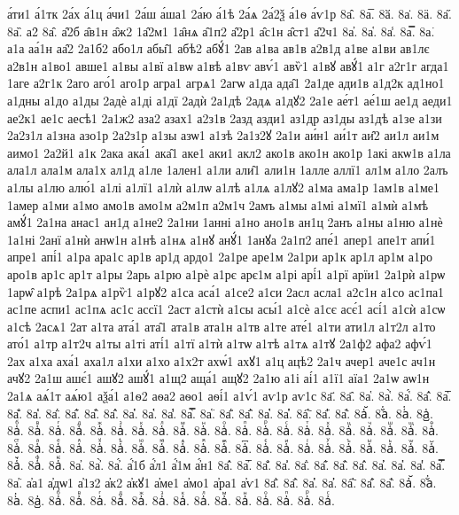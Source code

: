 {а́ти1
а́1тк
2а́х
а́1ц
а́чи1
2а́ш
а́ша1
2а́ю
а́1ѣ
2а́ѧ
2а́2ѯ
а́1ѳ
а́ѵ1р
8а̂.
8а̅.
8ӑ.
8а̇.
8ӓ.
8а̋.
8а̏.
а2̑
8а̑.
а̑2б
а̑в1н
а̑ж2
1а̑2м1
1а̑нѧ
а̑1п2
а̑2р1
а̑с1н
а̑ст1
а̑2ч1
8а̓.
8а̔.
8а̾.
8а̿.
8а͘.
а1а
аа́1н
аа̑2
2а1б2
або1л
абы̑1
абѣ2
абꙋ́1
2ав
а1ва
ав1в
а2в1д
а1ве
а1ви
ав1лє
а2в1н
а1во1
авше1
а1вы
а1вї
а1вѡ
а1вѣ
а1вѵ
авѵ́1
авѷ1
а1вꙋ
авꙋ́1
а1г
а2г1г
агда1
1аге
а2г1к
2аго
аго́1
аго1р
агра1
агрѧ1
2агѡ
а1да
ада̑1
2а1де
ади1в
а1д2к
ад1но1
а1дны
а1до
а1ды
2адѐ
а1ді
а1дї
2адѝ
2а1дѣ
2адѧ
а1дꙋ2
2а1е
ае́т1
ае́1ш
ае1д
аеди1
ае2к1
ае1с
аесѣ1
2а1ж2
аза2
азах1
а2з1в
2азд
азди1
аз1др
аз1ды
аз1дѣ
а1зе
а1зи
2а2з1л
а1зна
азо1р
2а2з1р
а1зы
азѡ1
а1зѣ
2а1з2ꙋ
2а1и
аи́н1
аи́1т
аи̑2
аи1л
аи1м
аимо1
2а2й1
а1к
2ака
ака́1
ака̑1
аке1
аки1
акл2
ако1в
ако1н
ако1р
1акі
акѡ1в
а1ла
ала1л
ала1м
ала1х
ал1д
а1ле
1ален1
а1ли
али̑1
али1н
1алле
аллї1
ал1м
а1ло
2алъ
а1лы
а1лю
алю́1
а1лі
а1лї1
а1лѝ
а1лѡ
а1лѣ
а1лѧ
а1лꙋ2
а1ма
ама1р
1ам1в
а1ме1
1амер
а1ми
а1мо
амо1в
амо1м
а2м1п
а2м1ч
2амъ
а1мы
а1мі
а1мї1
а1мѝ
а1мѣ
амꙋ́1
2а1на
анас1
ан1д
а1не2
2а1ни
1анні
а1но
ано1в
ан1ц
2анъ
а1ны
а1ню
а1нѐ
1а1ні
2анї
а1нѝ
анѡ1н
а1нѣ
а1нѧ
а1нꙋ
анꙋ́1
1анꙋа
2а1п2
апе́1
апер1
апе1т
апи́1
апре1
апі́1
а1ра
ара1с
ар1в
ар1д
ардо1
2а1ре
аре1м
2а1ри
ар1к
ар1л
ар1м
а1ро
аро1в
ар1с
ар1т
а1ры
2арь
а1рю
а1рѐ
а1рє
арє1м
а1рі
арі́1
а1рї
арїи1
2а1рѝ
а1рѡ
1арѡ̑
а1рѣ
2а1рѧ
а1рѷ1
а1рꙋ2
а1са
аса́1
а1се2
а1си
2асл
асла1
а2с1н
а1со
ас1па1
ас1пе
аспи1
ас1пѧ
ас1с
ассї1
2аст
а1стѝ
а1сы
асы́1
а1сѐ
а1сє
асє́1
асі́1
а1сѝ
а1сѡ
а1сѣ
2асѧ1
2ат
а1та
ата́1
ата̑1
ата1в
ата1н
а1тв
а1те
ате́1
а1ти
ати1л
а1т2л
а1то
ато́1
а1тр
а1т2ч
а1ты
а1ті
аті́1
а1тї
а1тѝ
а1тѡ
а1тѣ
а1тѧ
а1тꙋ
2а1ф2
афа2
афѵ́1
2ах
а1ха
аха́1
аха1л
а1хи
а1хо
а1х2т
ахѡ́1
ахꙋ1
а1ц
ацѣ2
2а1ч
ачер1
аче1с
ач1н
ачꙋ2
2а1ш
ашє́1
ашꙋ2
ашꙋ́1
а1щ2
аща́1
ащꙋ2
2а1ю
а1і
аі́1
а1ї1
аїа1
2а1ѡ
аѡ1н
2а1ѧ
аѧ́1т
аѧ́ю1
аѯа́1
а1ѳ2
аѳа2
аѳо1
аѳі́1
а1ѵ́1
аѵ1р
аѵ1с
8а҃.
8а҄.
8а҅.
8а҅̀.
8а҅́.
8а҅̂.
8а҅̅.
8а҅̆.
8а҅̇.
8а҅̈.
8а҅̋.
8а҅̏.
8а҅̑.
8а҅̓.
8а҅̔.
8а҅̾.
8а҅̿.
8а҅͘.
8а҅҃.
8а҅҄.
8а҅҅.
8а҅҆.
8а҅҇.
8а҅᷀.
8а҅᷁.
8а҅᷶.
8а᷷҅.
8а᷸҅.
8а᷹҅.
8а҅ⷠ.
8а҅ⷡ.
8а҅ⷢ.
8а҅ⷣ.
8а҅ⷤ.
8а҅ⷥ.
8а҅ⷦ.
8а҅ⷧ.
8а҅ⷨ.
8а҅ⷩ.
8а҅ⷪ.
8а҅ⷫ.
8а҅ⷬ.
8а҅ⷭ.
8а҅ⷮ.
8а҅ⷯ.
8а҅ⷰ.
8а҅ⷱ.
8а҅ⷲ.
8а҅ⷳ.
8а҅ⷴ.
8а҅ⷵ.
8а҅ⷶ.
8а҅ⷷ.
8а҅ⷸ.
8а҅ⷹ.
8а҅ⷺ.
8а҅ⷻ.
8а҅ⷼ.
8а҅ⷽ.
8а҅ⷾ.
8а҅ⷿ.
8а҅꙯.
8а҅ꙴ.
8а҅ꙵ.
8а҅ꙶ.
8а҅ꙷ.
8а҅ꙸ.
8а҅ꙹ.
8а҅ꙺ.
8а҅ꙻ.
8а҅꙼.
8а҅꙽.
8а҅ꚞ.
8а҅ꚟ.
8а҆.
8а҆̀.
8а҆́.
а҆́1б
а҆́л1
а҆́1м
а҆́н1
8а҆̂.
8а҆̅.
8а҆̆.
8а҆̇.
8а҆̈.
8а҆̋.
8а҆̏.
8а҆̑.
8а҆̓.
8а҆̔.
8а҆̾.
8а҆̿.
8а҆͘.
а҆а1
а҆дѡ1
а҆1з2
а҆к2
а҆кꙋ1
а҆ме1
а҆мо1
а҆ра1
а҆ѵ1
8а҆҃.
8а҆҄.
8а҆҅.
8а҆҆.
8а҆҇.
8а҆᷀.
8а҆᷁.
8а҆᷶.
8а᷷҆.
8а᷸҆.
8а᷹҆.
8а҆ⷠ.
8а҆ⷡ.
8а҆ⷢ.
8а҆ⷣ.
8а҆ⷤ.
8а҆ⷥ.
8а҆ⷦ.
8а҆ⷧ.
8а҆ⷨ.
8а҆ⷩ.
8а҆ⷪ.
8а҆ⷫ.
8а҆ⷬ.
8а҆ⷭ.
}

